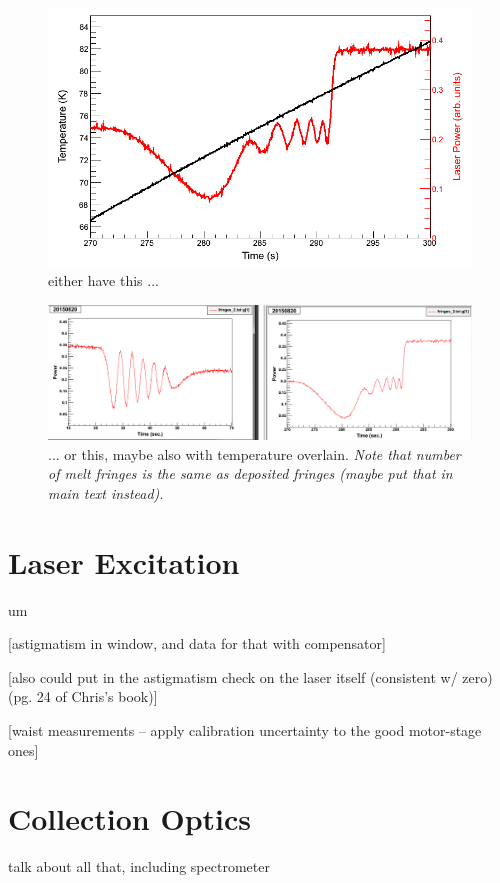 \begin{figure} %
        \centering
                \includegraphics[width=.7\textwidth]{figures/fringes_melt.png}
                \caption{either have this ...}
\label{fig:fringes_melt_alone}
\end{figure}

\begin{figure} %
        \centering
                \includegraphics[width=.7\textwidth]{figures/fringe_dep_and_melt_temporary.png}
                \caption{... or this, maybe also with temperature overlain. \emph{\color{red}Note that number of melt fringes is the same as deposited fringes (maybe put that in main text instead).}}
\label{fig:fringes_melt_withDep}
\end{figure}

\section{Laser Excitation}

um

[astigmatism in window, and data for that with compensator]

[also could put in the astigmatism check on the laser itself (consistent w/ zero) (pg. 24 of Chris's book)]

[waist measurements -- apply calibration uncertainty to the good motor-stage ones]

\section{Collection Optics}

talk about all that, including spectrometer